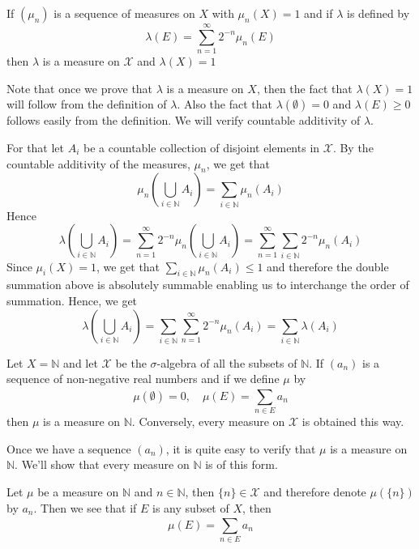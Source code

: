 \begin{exercise}[C]
	If $(\mu_n)$ is a sequence of measures on $ X$ with $ \mu_n(X) = 1$ and if $\lambda$ is defined by $$\lambda(E) = \sum_{n=1}^{\infty} 2^{-n} \mu_{n}(E)$$
	then $\lambda$ is a measure on $\mathcal{X}$ and $\lambda(X) = 1$
\end{exercise}
\begin{solution}
	Note that once we prove that $  \lambda$ is a measure on $X$, then the fact that $ \lambda(X) = 1$ will follow from the definition of $\lambda$. Also the fact that $\lambda(\emptyset) = 0$ and $\lambda(E) \ge 0$ follows easily from the definition. We will verify countable additivity of $\lambda$.

	For that let $A_i$ be a countable collection of disjoint elements in $ \mathcal{X}$. By the countable additivity of the measures, $ \mu_n$, we get that $$\mu_n(\bigcup_{i \in \mathbb{N}} A_i) = \sum_{i \in \mathbb{N}}^{} \mu_n(A_i)$$
	Hence $$\lambda(\bigcup_{i \in \mathbb{N}} A_i) = \sum_{ n=1}^{\infty} 2^{-n} \mu_n(\bigcup_{i \in \mathbb{N}} A_i) = \sum_{n=1}^{\infty} \sum_{ i \in \mathbb{N}}^{}  2^{-n}\mu_n(A_i)$$
	Since $  \mu_i(X) = 1$, we get that $ \sum_{i\in \mathbb{N}}^{} \mu_n(A_i) \le 1$ and therefore the double summation above is absolutely summable enabling us to interchange the order of summation. Hence, we get \[\lambda(\bigcup_{i \in \mathbb{N}} A_i) = \sum_{i \in \mathbb{N}}^{} \sum_{n = 1}^{\infty} 2^{-n}\mu_n(A_i) = \sum_{i \in \mathbb{N}}^{} \lambda(A_i)\]
\end{solution}

\begin{exercise}[D]
	Let $X=\mathbb{N}$ and let $\mathcal{X}$ be the $ \sigma$-algebra of all the subsets of $\mathbb{N}$. If $(a_n)$ is a sequence of non-negative real numbers and if we define $ \mu$ by $$\mu(\emptyset) = 0, \quad  \mu(E) = \sum_{n \in E}^{} a_n$$
	then $\mu$  is a measure on $\mathbb{ N}$. Conversely, every measure on $\mathcal{ X}$ is obtained this way.
\end{exercise}
\begin{solution}
	Once we have a sequence $(a_n)$, it is quite easy to verify that $ \mu$ is a measure on $\mathbb{ N}$. We'll show that every measure on $\mathbb{ N}$ is of this form.

	Let $ \mu$ be a measure on $ \mathbb{N}$ and $n \in \mathbb{N}$, then $ \{ n \} \in \mathcal{X}$ and therefore denote $\mu(\{ n \})$ by $a_n$. Then we see that if $E$ is any subset of $ X$, then $$\mu(E) = \sum_{ n\in E}^{} a_n$$
\end{solution}

